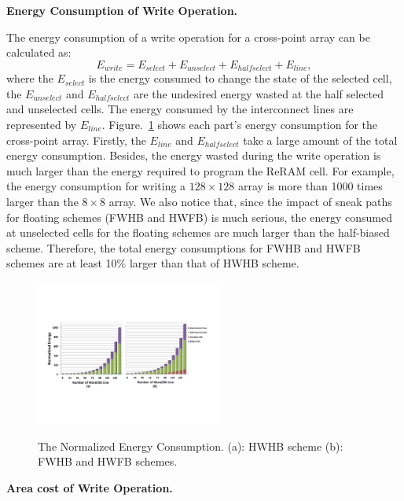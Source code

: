 \vspace{10pt} \textbf{Energy Consumption of Write Operation.} \vspace{8pt}

The energy consumption of a write operation for a cross-point array can be calculated as:
\begin{equation}
E_{write} = E_{select} + E_{unselect} + E_{halfselect} + E_{line},
\end{equation}
where the $E_{select}$ is the energy consumed to change the state of the
selected cell, the $E_{unselect}$ and $E_{halfselect}$ are the undesired energy wasted at the half selected and unselected cells. The energy consumed by the interconnect lines are represented by $E_{line}$. Figure.~\ref{fig:energy} shows each part's energy consumption for the cross-point array. Firstly, the $E_{line}$ and $E_{halfselect}$ take a large amount of the total energy consumption. Besides, the energy wasted during the write operation is much larger than the energy required to program the ReRAM cell. For example, the energy consumption for writing a $128{\times}128$ array is more than 1000 times larger than the $8{\times}8$ array. We also notice that, since the impact of sneak paths for floating schemes (FWHB and HWFB) is much serious, the energy consumed at unselected cells for the floating schemes are much larger than the half-biased scheme. Therefore, the total energy consumptions for FWHB and HWFB schemes are at least 10\% larger than that of HWHB scheme.


\begin{figure}%
\centering
  \includegraphics[width=0.55\textwidth]{./figures/Energy3.pdf}\\
  \caption{The Normalized Energy Consumption. (a): HWHB scheme (b): FWHB and HWFB schemes.}\label{fig:energy}
\end{figure}

\vspace{10pt} \textbf{Area cost of Write Operation.} \vspace{8pt}

